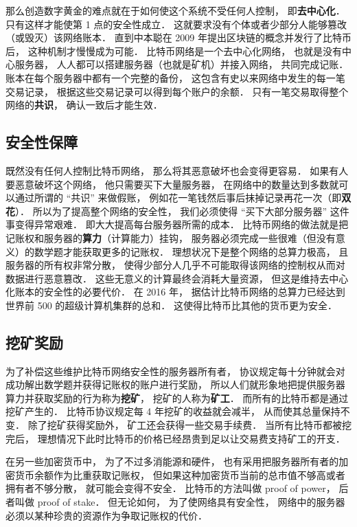 那么创造数字黄金的难点就在于如何使这个系统不受任何人控制， 即\textbf{去中心化}． 只有这样才能使第 1 点的安全性成立． 这就要求没有个体或者少部分人能够篡改（或毁灭）该网络账本． 直到中本聪在 2009 年提出区块链的概念并发行了比特币后， 这种机制才慢慢成为可能． 比特币网络是一个去中心化网络， 也就是没有中心服务器， 人人都可以搭建服务器（也就是矿机）并接入网络， 共同完成记账． 账本在每个服务器中都有一个完整的备份， 这包含有史以来网络中发生的每一笔交易记录， 根据这些交易记录可以得到每个账户的余额． 只有一笔交易取得整个网络的\textbf{共识}， 确认一致后才能生效．

\subsection{安全性保障}
既然没有任何人控制比特币网络， 那么将其恶意破坏也会变得更容易． 如果有人要恶意破坏这个网络， 他只需要买下大量服务器， 在网络中的数量达到多数就可以通过所谓的 “共识” 来做假账， 例如花一笔钱然后事后抹掉记录再花一次（即\textbf{双花}）． 所以为了提高整个网络的安全性， 我们必须使得 “买下大部分服务器” 这件事变得异常艰难． 即大大提高每台服务器所需的成本． 比特币网络的做法就是把记账权和服务器的\textbf{算力}（计算能力）挂钩， 服务器必须完成一些很难（但没有意义）的数学题才能获取更多的记账权． 理想状况下是整个网络的总算力极高， 且服务器的所有权非常分散， 使得少部分人几乎不可能取得该网络的控制权从而对数据进行恶意篡改． 这些无意义的计算最终会消耗大量资源， 但这是维持去中心化账本的安全性的必要代价． 在 2016 年， 据估计比特币网络的总算力已经达到世界前 500 的超级计算机集群的总和． 这使得比特币比其他的货币更为安全．

\subsection{挖矿奖励}
为了补偿这些维护比特币网络安全性的服务器所有者， 协议规定每十分钟就会对成功解出数学题并获得记账权的账户进行奖励， 所以人们就形象地把提供服务器算力并获取奖励的行为称为\textbf{挖矿}， 挖矿的人称为\textbf{矿工}． 而所有的比特币都是通过挖矿产生的． 比特币协议规定每 4 年挖矿的收益就会减半， 从而使其总量保持不变． 除了挖矿获得奖励外， 矿工还会获得一些交易手续费． 当所有比特币都被挖完后， 理想情况下此时比特币的价格已经昂贵到足以让交易费支持矿工的开支．

在另一些加密货币中， 为了不过多消能源和硬件， 也有采用把服务器所有者的加密货币余额作为比重获取记账权， 但如果这种加密货币当前的总市值不够高或者拥有者不够分散， 就可能会变得不安全． 比特币的方法叫做 proof of power， 后者叫做 proof of stake． 但无论如何， 为了使网络具有安全性， 网络中的服务器必须以某种珍贵的资源作为争取记账权的代价．
